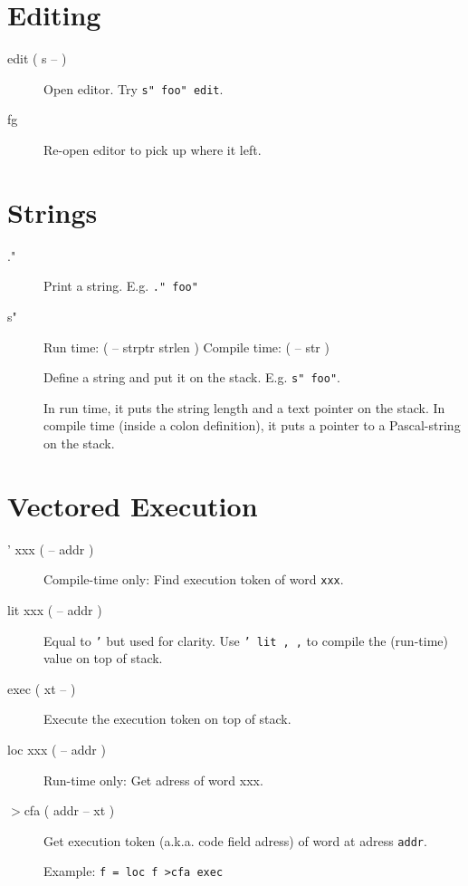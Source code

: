 \section{Editing}

\begin{description}
\item[edit ( s -- )]

Open editor. Try \texttt{s" foo" edit}.

\item[fg]

Re-open editor to pick up where it left.

\end{description}

\section{Strings}

\begin{description}
\item[."]

Print a string. E.g. \texttt{." foo"}

\item[s"] Run time: ( -- strptr strlen ) Compile time: ( -- str )

Define a string and put it on the stack. E.g. \texttt{s" foo"}. 

In run time, it puts the string length and a text pointer on the stack. In compile time (inside a colon definition), it puts a pointer to a Pascal-string on the stack.

\end{description}


\section{Vectored Execution}

\begin{description}
\item[' xxx ( -- addr )] Compile-time only: Find execution token of word \texttt{xxx}.
\item[lit xxx ( -- addr )] Equal to \texttt{'} but used for clarity. Use \texttt{' lit , ,} to compile the (run-time) value on top of stack.
\item[exec ( xt -- )] Execute the execution token on top of stack.
\item[loc xxx ( -- addr )] Run-time only: Get adress of word xxx.
\item[$>$cfa ( addr -- xt )] Get execution token (a.k.a. code field adress) of word at adress \texttt{addr}.

Example: \texttt{f = loc f >cfa exec}
\end{description}


